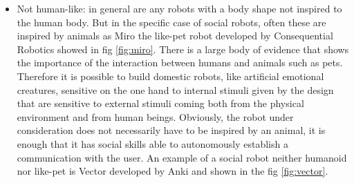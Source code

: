 \documentclass{thesisreport}
\begin{document}
\begin{itemize}
\item Not human-like: in general are any robots with a body shape not inspired to the human body. But in the specific case of social robots, often these are inspired by animals as Miro \cite{miro} the like-pet robot developed by Consequential Robotics showed in fig \ref{fig:miro}. 
There is a large body of evidence that shows the importance of the interaction between humans and animals such as pets. Therefore it is possible to build domestic robots, like artificial emotional creatures, sensitive on the one hand to internal stimuli given by the design that are sensitive to external stimuli coming both from the physical environment and from human beings.   
Obviously, the robot under consideration does not necessarily have to be inspired by an animal, it is enough that it has social skills able to  autonomously establish a communication with the user. An example of a social robot neither humanoid nor like-pet is Vector developed by Anki \cite{anki} and shown in the fig \ref{fig:vector}.
\end{itemize}
\end{document}
